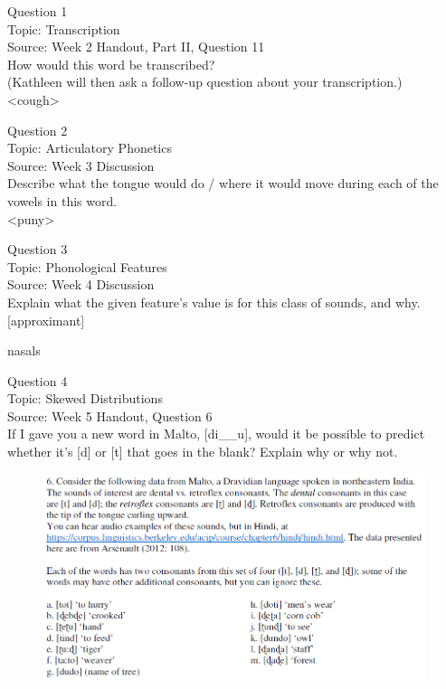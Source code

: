 \documentclass[12pt]{article}
\begin{document}
{\large Question 1}\\

Topic: Transcription\\
Source: Week 2 Handout, Part II, Question 11\\

How would this word be transcribed?\\ (Kathleen will then ask a follow-up question about your transcription.)\\

<cough>


\newpage

{\large Question 2}\\

Topic: Articulatory Phonetics\\
Source: Week 3 Discussion\\

Describe what the tongue would do / where it would move during each of the vowels in this word.\\

<puny>


\newpage

{\large Question 3}\\

Topic: Phonological Features\\
Source: Week 4 Discussion\\

Explain what the given feature’s value is for this class of sounds, and why.\\

{[approximant]}

nasals


\newpage

{\large Question 4}\\

Topic: Skewed Distributions\\
Source: Week 5 Handout, Question 6\\

If I gave you a new word in Malto, [di\_\_u], would it be possible to predict whether it's [d] or [t] that goes in the blank? Explain why or why not.\\

\begin{figure}[H]
\includegraphics{../images/malto.png}
\end{figure}
\end{document}
